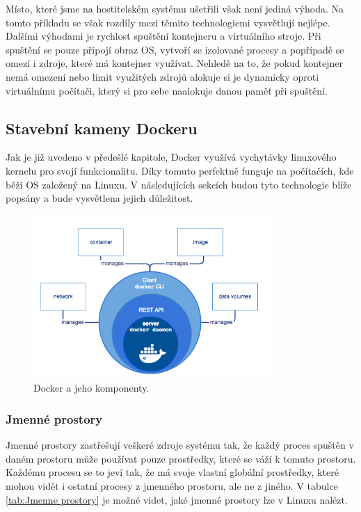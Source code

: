 Místo, které jsme na hostitelském systému ušetřili však není jediná výhoda. Na tomto příkladu se však rozdíly mezi těmito technologiemi vysvětlují nejlépe. Dalšími výhodami je rychlost spuštění kontejneru a virtuálního stroje. Při spuštění se pouze připojí obraz OS, vytvoří se izolované procesy a popřípadě se omezí i zdroje, které má kontejner využívat. Nehledě na to, že pokud kontejner nemá omezení nebo limit využitých zdrojů alokuje si je dynamicky oproti virtuálnímu počítači, který si pro sebe naalokuje danou paměť při spuštění.  


\subsection{Stavební kameny Dockeru}

Jak je již uvedeno v předešlé kapitole, Docker využívá vychytávky linuxového kernelu pro svojí funkcionalitu. Díky tomuto perfektně funguje na počítačích, kde běží OS založený na Linuxu. V následujících sekcích budou tyto technologie blíže popsány a bude vysvětlena jejich důležitost. 

\begin{figure}[!h]
	\centering
	\includegraphics[width=0.8\textwidth, angle=0]{docker-architecture.png}
	\caption[Docker architektura]{Docker a jeho komponenty.}
	\label{fig:docker-architecture}
\end{figure}


\subsubsection{Jmenné prostory}

Jmenné prostory zastřešují veškeré zdroje systému tak, že každý proces spuštěn v daném prostoru může používat pouze prostředky, které se váží k tomuto prostoru. Každému procesu se to jeví tak, že má svoje vlastní globální prostředky, které mohou vidět i ostatní procesy z jmenného prostoru, ale ne z jiného. V tabulce \ref{tab:Jmenne prostory} je možné videt, jaké jmenné prostory lze v Linuxu nalézt.

